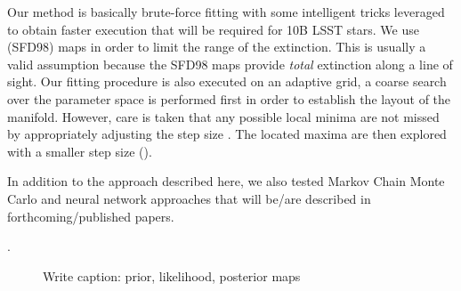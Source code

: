 
Our method is basically brute-force fitting with some intelligent tricks leveraged to obtain faster execution that will be required for 10B LSST stars. We use \cite{schlegel_maps_1998} (SFD98) maps in order to limit the range of the extinction. This is usually a valid assumption because the SFD98 maps provide \textit{total} extinction along a line of sight. Our fitting procedure is also executed on an adaptive grid, a coarse search over the parameter space is performed first in order to establish the layout of the manifold. However, care is taken that any possible local minima are not missed by appropriately adjusting the step size . The located maxima are then explored with a smaller step size ().

In addition to the approach described here, we also tested Markov Chain Monte Carlo and neural network approaches that will be/are described in forthcoming/published papers.


.




\begin{figure*}[ht!]
\caption{Write caption: prior, likelihood, posterior maps}
\label{fig:bayesPanels}
\end{figure*}

 
